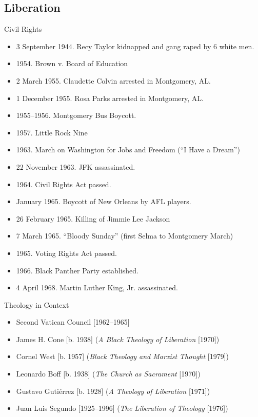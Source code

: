 \subsection{Liberation}
\begin{frame}{Civil Rights}
	\begin{itemize}
		\item<+->3 September 1944. Recy Taylor kidnapped and gang raped by 6 white men.
		\item<+->1954. Brown v. Board of Education
		\item<+->2 March 1955. Claudette Colvin arrested in Montgomery, AL.
		\item<+->1 December 1955. Rosa Parks arrested in Montgomery, AL.
		\item<+->1955--1956. Montgomery Bus Boycott.
		\item<+->1957. Little Rock Nine
		\item<+->1963. March on Washington for Jobs and Freedom (``I Have a Dream'')
		\item<+->22 November 1963. JFK assassinated.
		\item<+->1964. Civil Rights Act passed.
		\item<+->January 1965. Boycott of New Orleans by AFL players.
		\item<+->26 February 1965. Killing of Jimmie Lee Jackson
		\item<+->7 March 1965. ``Bloody Sunday'' (first Selma to Montgomery March)
		\item<+->1965. Voting Rights Act passed.
		\item<+->1966. Black Panther Party established.
		\item<+->4 April 1968. Martin Luther King, Jr. assassinated.
	\end{itemize}
\end{frame}

\begin{frame}{Theology in Context}
	\begin{itemize}
		\item<+->Second Vatican Council [1962--1965]
		\item<+->James H. Cone [b. 1938] (\emph{A Black Theology of Liberation} [1970])
		\item<+->Cornel West [b. 1957] (\emph{Black Theology and Marxist Thought} [1979])
		\item<+->Leonardo Boff [b. 1938] (\emph{The Church as Sacrament} [1970])
		\item<+->Gustavo Guti{\'e}rrez [b. 1928] (\emph{A Theology of Liberation} [1971])
		\item<+->Juan Luis Segundo [1925--1996] (\emph{The Liberation of Theology} [1976])
	\end{itemize}
\end{frame}

